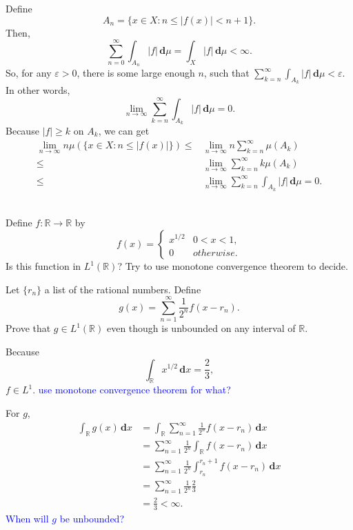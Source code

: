 \documentclass[12pt]{article}
\newenvironment{exercise}[1]{\begin{tcolorbox}[colback=black!15, colframe=black!80, breakable, title=#1]}{\end{tcolorbox}}
\newenvironment{proof}{\begin{tcolorbox}[colback=white, colframe=black!50, breakable, title=Proof. ]\setlength{\parskip}{0.8em}}{\,\\\rightline{$\square$}\end{tcolorbox}}
\newenvironment{solution}{\begin{tcolorbox}[colback=white, colframe=black!50, breakable, title=Solution. ]\setlength{\parskip}{0.8em}}{\end{tcolorbox}}
\newcommand{\der}{\,\mathbf{d}}
\begin{document}
    \begin{proof}
        Define
        \[
            A_n=\{x\in X: n\leqslant|f(x)|< n+1\}. 
        \]
        Then, 
        \[
            \sum_{n=0}^\infty\int_{A_n}|f|\der \mu=\int_X|f|\der \mu<\infty. 
        \]
        So, for any $\varepsilon>0$, there is some large enough $n$, such that $\sum_{k=n}^\infty\int_{A_k}|f|\der \mu<\varepsilon$. In other words, 
        \[
            \lim_{n\to\infty}\sum_{k=n}^\infty\int_{A_k}|f|\der \mu=0. 
        \]
        Because $|f|\geqslant k$ on $A_k$, we can get 
        \[
            \begin{aligned}
                \lim_{n\to\infty}n\mu(\{x\in X: n\leqslant|f(x)|\})
                \leqslant&\lim_{n\to\infty}n\sum_{k=n}^\infty\mu(A_k)\\
                \leqslant&\lim_{n\to\infty}\sum_{k=n}^\infty k\mu(A_k)\\
                \leqslant&\lim_{n\to\infty}\sum_{k=n}^\infty\int_{A_k}|f|\der \mu=0. 
            \end{aligned}
        \]
        \vspace*{-30pt}
    \end{proof}

    \begin{exercise}{3}
        Define $f : \mathbb{R} \to \mathbb{R}$ by
        \[
            f(x)=\begin{cases}
                x^{1/2} & 0<x<1, \\
                0 & otherwise. 
            \end{cases}
        \]
        Is this function in $L^1(\mathbb{R})$? Try to use monotone convergence theorem to decide. 
        
        Let $\{r_n\}$ a list of the rational numbers. Define 
        \[
            g(x)=\sum_{n=1}^\infty\frac{1}{2^n}f(x-r_n). 
        \]
        Prove that $g \in L^1(\mathbb{R})$ even though is unbounded on any interval of $\mathbb{R}$. 
    \end{exercise}

    \begin{solution}
        Because
        \[
            \int_{\mathbb{R}}x^{1/2}\der x=\frac{2}{3}, 
        \]
        $f\in L^1$. \textcolor{blue}{use monotone convergence theorem for what? }
        
        For $g$, 
        \[
            \begin{aligned}
                \int_\mathbb{R}g(x)\der x&=\int_\mathbb{R}\sum_{n=1}^\infty\frac{1}{2^n}f(x-r_n) \der x \\
                &=\sum_{n=1}^\infty\frac{1}{2^n}\int_\mathbb{R}f(x-r_n)\der x \\
                &=\sum_{n=1}^\infty\frac{1}{2^n}\int_{r_n}^{r_n + 1}f(x-r_n)\der x \\
                &=\sum_{n=1}^\infty\frac{1}{2^n}\frac{2}{3} \\
                &=\frac{2}{3}<\infty. 
            \end{aligned}
        \]
        \textcolor{blue}{When will $g$ be unbounded? }
    \end{solution}
\end{document}
